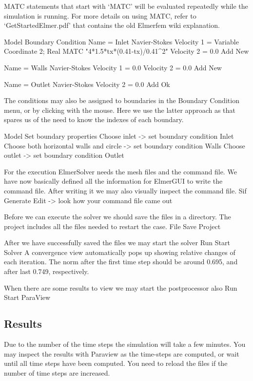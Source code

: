 MATC statements that start with `MATC' will be evaluated repeatedly while the simulation
is running.  For more details on using MATC, refer to `GetStartedElmer.pdf' that contains
the old Elmerfem wiki explanation.

\ttbegin
Model
  Boundary Condition
    Name = Inlet
    Navier-Stokes 
      Velocity 1 = Variable Coordinate 2; Real MATC "4*1.5*tx*(0.41-tx)/0.41^2"
      Velocity 2 = 0.0
    Add
    New

    Name = Walls
    Navier-Stokes 
      Velocity 1 = 0.0
      Velocity 2 = 0.0
    Add
    New

    Name = Outlet
    Navier-Stokes 
      Velocity 2 = 0.0
    Add 
    Ok
\ttend   

The conditions may also be assigned to boundaries in the Boundary Condition menu, or
by clicking with the mouse. Here we use the latter approach as that spares us of the 
need to know the indexes of each boundary.

\ttbegin
Model
  Set boundary properties
    Choose inlet -> set boundary condition Inlet
    Choose both horizontal walls and circle -> set boundary condition Walls
    Choose outlet -> set boundary condition Outlet
\ttend

For the execution 
ElmerSolver needs the mesh files and the command file. We have now basically defined
all the information for ElmerGUI to write the command file. After writing it we may also visually 
inspect the command file.
\ttbegin
Sif 
  Generate
  Edit -> look how your command file came out  
\ttend

Before we can execute the solver we should save the files in a directory. The project includes
all the files needed to restart the case.
\ttbegin
File 
  Save Project
\ttend

After we have successfully saved the files we may start the solver
\ttbegin
Run
  Start Solver
\ttend
A convergence view automatically pops up showing relative changes of each iteration.
The norm after the first time step should be around 0.695, and after last 0.749, respectively.

When there are some results to view we may start the postprocessor also
\ttbegin
Run
  Start ParaView
\ttend


\subsection*{Results}

Due to the number of the time steps the simulation will take a few minutes.
You may inspect the results with Paraview as the time-steps are computed, or
wait until all time steps have been computed.
You need to reload the files if the number of time steps are increased.

